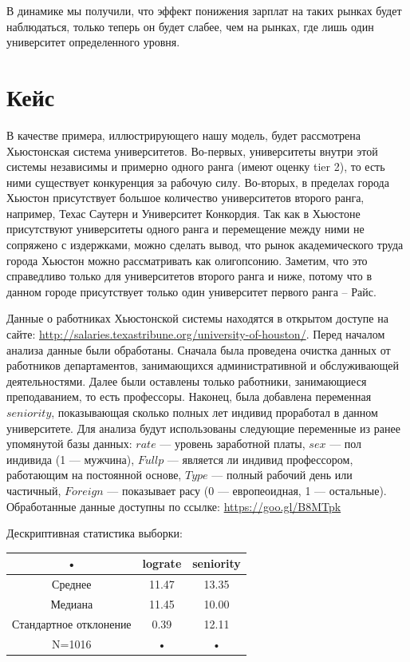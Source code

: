 \documentclass[a4paper, 12pt]{article}
\theoremstyle{definition}
\theoremstyle{plain}
\begin{document}
В динамике мы получили, что эффект понижения зарплат на таких рынках будет наблюдаться, только теперь он будет  слабее, чем на рынках, где лишь один университет определенного уровня.

\section{Кейс}

В качестве примера, иллюстрирующего нашу модель, будет рассмотрена Хьюстонская система университетов. Во-первых, университеты внутри этой системы независимы и примерно одного ранга (имеют оценку tier 2), то есть ними существует конкуренция за рабочую силу. Во-вторых, в пределах города Хьюстон присутствует большое количество университетов второго ранга, например, Техас Саутерн и Университет Конкордия. Так как в Хьюстоне присутствуют университеты одного ранга и перемещение между ними не сопряжено с издержками, можно сделать вывод, что рынок академического труда города Хьюстон можно рассматривать как олигопсонию. Заметим, что это справедливо только для университетов второго ранга и ниже, потому что в данном городе присутствует только один университет первого ранга -- Райс.

Данные о работниках Хьюстонской системы находятся в открытом доступе на сайте: \url{http://salaries.texastribune.org/university-of-houston/}. Перед началом анализа данные были обработаны. Сначала была проведена очистка данных от работников департаментов, занимающихся административной и обслуживающей деятельностями. Далее были оставлены только работники, занимающиеся преподаванием, то есть профессоры. Наконец, была добавлена переменная $seniority$, показывающая сколько полных лет индивид проработал в данном университете.
Для анализа будут использованы следующие переменные из ранее упомянутой базы данных: $rate$ --- уровень заработной платы, $sex$ --- пол индивида (1 --- мужчина), $Fullp$ --- является ли индивид профессором, работающим на постоянной основе, $Type$ --- полный рабочий день или частичный, $Foreign$ --- показывает расу (0 --- европеоидная, 1 --- остальные). Обработанные данные доступны по ссылке: \url{https://goo.gl/B8MTpk}


Дескриптивная статистика выборки:

\begin{center}
\begin{tabular}{|c|c|c|}
\hline 
• & lograte & seniority \\ 
\hline 
Среднее & 11.47 & 13.35 \\ 
\hline 
Медиана & 11.45 & 10.00 \\ 
\hline 
Стандартное отклонение & 0.39 & 12.11 \\ 
\hline 
N=1016 & • & • \\ 
\hline 
\end{tabular} 
\end{center}
\end{document}
